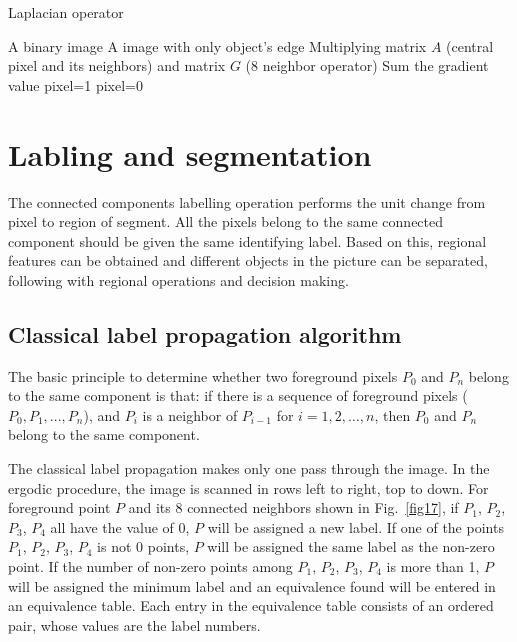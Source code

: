 \documentclass[hyperref]{article}
\theoremstyle{nonumberplain}
\begin{document}
	\begin{algorithm}
		\renewcommand{\algorithmicrequire}{\textbf{Input:}}
		\renewcommand{\algorithmicensure}{\textbf{Output:}}
		\caption{Laplacian operator}
		\label{alg3}
		\begin{algorithmic}[1]
			\REQUIRE A binary image
			\ENSURE A image with only object's edge 
				\STATE Multiplying matrix $A$ (central pixel and its neighbors) and matrix $G$ (8 neighbor operator)
				\STATE Sum the gradient value
					\STATE pixel=1
				\ELSE
					\STATE pixel=0
				\ENDIF
			\ENDFOR
		\end{algorithmic}  
	\end{algorithm}
	
	\section{Labling and segmentation}
	
	\hspace{1.0em}
	The connected components labelling operation performs the unit change from pixel to region of segment. All the pixels belong to the same connected component should be given the same identifying label. Based on this, regional features can be obtained and different objects in the picture can be separated, following with regional operations and decision making.
	
	\subsection{Classical label propagation algorithm}
	
	\hspace{1.0em}
	The basic principle to determine whether two foreground pixels $P_{0}$ and $P_{n}$ belong to the same component is that: if there is a sequence of foreground pixels ($P_{0},P_{1},...,P_{n}$), and $P_{i}$ is a neighbor of $P_{i-1}$ for $i=1,2,…,n$, then $P_{0}$ and $P_{n}$ belong to the same component. 
	
	The classical label propagation makes only one pass through the image. In the ergodic procedure, the image is scanned in rows left to right, top to down. For foreground point $P$ and its 8 connected neighbors shown in Fig.~\ref{fig17}, if $P_{1}$, $P_{2}$, $P_{3}$, $P_{4}$ all have the value of 0, $P$ will be assigned a new label. If one of the points $P_{1}$, $P_{2}$, $P_{3}$, $P_{4}$ is not 0 points, $P$ will be assigned the same label as the non-zero point. If the number of non-zero points among $P_{1}$, $P_{2}$, $P_{3}$, $P_{4}$ is more than 1, $P$ will be assigned the minimum label and an equivalence found will be entered in an equivalence table. Each entry in the equivalence table consists of an ordered pair, whose values are the label numbers.
	
\end{document}
